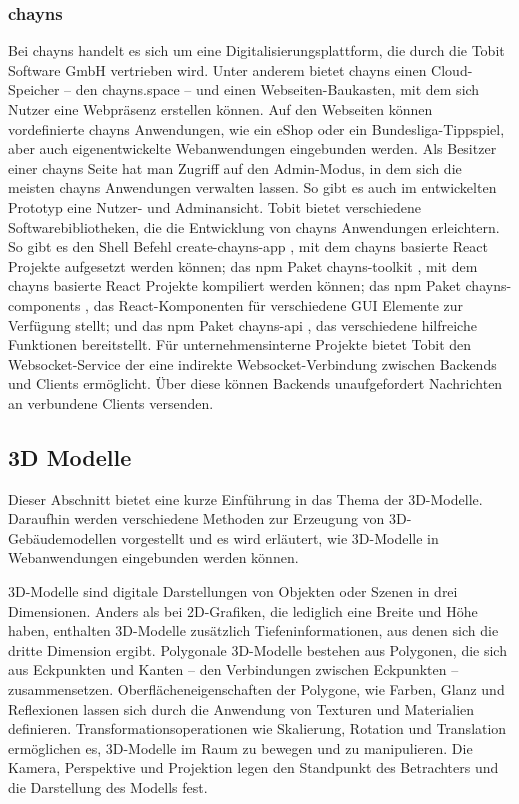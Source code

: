 \subsubsection{chayns}\label{sec:Chayns}
Bei chayns handelt es sich um eine Digitalisierungsplattform, die durch die Tobit Software GmbH vertrieben wird. Unter anderem bietet chayns einen Cloud-Speicher – den chayns.space – und einen Webseiten-Baukasten, mit dem sich Nutzer eine Webpräsenz erstellen können. Auf den Webseiten können vordefinierte chayns Anwendungen, wie ein eShop oder ein Bundesliga-Tippspiel, aber auch eigenentwickelte Webanwendungen eingebunden werden.\cite{chayns} Als Besitzer einer chayns Seite hat man Zugriff auf den Admin-Modus, in dem sich die meisten chayns Anwendungen verwalten lassen. So gibt es auch im entwickelten Prototyp eine Nutzer- und Adminansicht. Tobit bietet verschiedene Softwarebibliotheken, die die Entwicklung von chayns Anwendungen erleichtern. So gibt es den Shell Befehl create-chayns-app \cite{CreateChaynsApp}, mit dem chayns basierte React Projekte aufgesetzt werden können; das \ac{npm} Paket chayns-toolkit \cite{ChaynsToolkit}, mit dem chayns basierte React Projekte kompiliert werden können; das \ac{npm} Paket chayns-components \cite{ChaynsComponents}, das React-Komponenten für verschiedene \ac{GUI} Elemente zur Verfügung stellt; und das \ac{npm} Paket chayns-api \cite{ChaynsApi}, das verschiedene hilfreiche Funktionen bereitstellt. Für unternehmensinterne Projekte bietet Tobit den \gls{Websocket}-Service der eine indirekte \gls{Websocket}-Verbindung zwischen Backends und Clients ermöglicht. Über diese können Backends unaufgefordert Nachrichten an verbundene Clients versenden.

\subsection{3D Modelle}
Dieser Abschnitt bietet eine kurze Einführung in das Thema der 3D-Modelle. Daraufhin werden verschiedene Methoden zur Erzeugung von 3D-Gebäudemodellen vorgestellt und es wird erläutert, wie 3D-Modelle in Webanwendungen eingebunden werden können.

3D-Modelle sind digitale Darstellungen von Objekten oder Szenen in drei Dimensionen. Anders als bei 2D-Grafiken, die lediglich eine Breite und Höhe haben, enthalten 3D-Modelle zusätzlich Tiefeninformationen, aus denen sich die dritte Dimension ergibt. Polygonale 3D-Modelle bestehen aus Polygonen, die sich aus Eckpunkten und Kanten – den Verbindungen zwischen Eckpunkten – zusammensetzen. Oberflächeneigenschaften der Polygone, wie Farben, Glanz und Reflexionen lassen sich durch die Anwendung von Texturen und Materialien definieren. Transformationsoperationen wie Skalierung, Rotation und Translation ermöglichen es, 3D-Modelle im Raum zu bewegen und zu manipulieren. Die Kamera, Perspektive und Projektion legen den Standpunkt des Betrachters und die Darstellung des Modells fest.\cite[S.~8-16]{Parisi2014}

